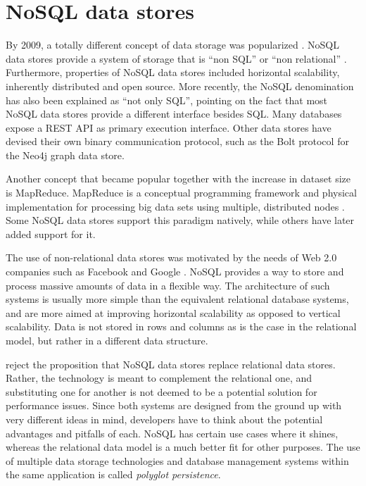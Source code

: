 \section{NoSQL data stores}
\label{sec:nosql-data-stores}

By 2009, a totally different concept of data storage was popularized \autocite{Leavitt2018}.
NoSQL data stores provide a system of storage that is ``non SQL'' or ``non relational'' \autocite{NoSQL2018}.
Furthermore, properties of NoSQL data stores included horizontal scalability, inherently distributed and open source.
More recently, the NoSQL denomination has also been explained as ``not only SQL'', pointing on the fact that most NoSQL data stores provide a different interface besides SQL.
Many databases expose a REST API as primary execution interface.
Other data stores have devised their own binary communication protocol, such as the Bolt protocol \autocite{Bolt2015} for the Neo4j graph data store.

Another concept that became popular together with the increase in dataset size is MapReduce.
MapReduce is a conceptual programming framework and physical implementation for processing big data sets using multiple, distributed nodes \autocite{Dean2008}.
Some NoSQL data stores support this paradigm natively, while others have later added support for it.

The use of non-relational data stores was motivated by the needs of Web 2.0 companies such as Facebook and Google \autocite{Mohan2013}.
NoSQL provides a way to store and process massive amounts of data in a flexible way.
The architecture of such systems is usually more simple than the equivalent relational database systems, and are more aimed at improving horizontal scalability as opposed to vertical scalability.
Data is not stored in rows and columns as is the case in the relational model, but rather in a different data structure.

\textcite{Sadalage2012} reject the proposition that NoSQL data stores replace relational data stores.
Rather, the technology is meant to complement the relational one, and substituting one for another is not deemed to be a potential solution for performance issues.
Since both systems are designed from the ground up with very different ideas in mind, developers have to think about the potential advantages and pitfalls of each.
NoSQL has certain use cases where it shines, whereas the relational data model is a much better fit for other purposes.
The use of multiple data storage technologies and database management systems within the same application is called \textit{polyglot persistence}.

